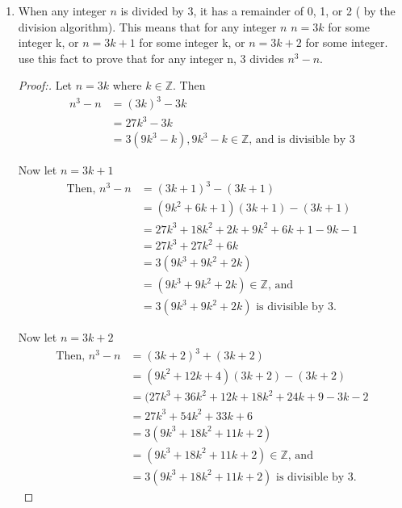 \documentclass[11pt]{article}
\begin{document}
\begin{enumerate}
    \item When any integer $n$ is divided by 3, it has a remainder of 0, 1, or 2 ( by the division algorithm). This means that for any integer $n$ 
            \newline \newline
             $n = 3k$ for some integer k, or
            \newline
            $n = 3k+1$ for some integer k, or 
            \newline
            $n = 3k+2$ for some integer.
    use this fact to prove that for any integer n, 3 divides $n^3 - n$.
        \begin{proof}[Proof:\nopunct]
         Let $n=3k$ where $k\in \mathbb{Z}$. Then
           \begin{align*}
               n^3-n & = (3k)^3-3k \\ 
                     & =27k^3-3k \\
                     & = 3(9k^3 - k), 9k^3-k \in \mathbb{Z} \text{, and is divisible by 3}
           \end{align*}
           
           \pagebreak
           Now let $n=3k+1$
           \begin{align*}
               \text{Then, } n^3-n & = (3k+1)^3-(3k+1) \\ 
                     & = (9k^2+6k+1)(3k+1)-(3k+1) \\
                     & = 27k^3 + 18k^2+2k+9k^2+6k+1-9k-1 \\
                     & = 27k^3 + 27k^2+6k \\
                     & = 3(9k^3+9k^2+2k) \\
                     & = (9k^3+9k^2+2k) \in \mathbb{Z} \text{, and} \\
                     & = 3(9k^3+9k^2+2k) \text{ is divisible by 3.}
           \end{align*}
           
           Now let $n=3k+2$
           \begin{align*}
               \text{Then, } n^3-n & = (3k+2)^3+(3k+2) \\
                                & = (9k^2+12k+4)(3k+2) - (3k+2) \\
                                & = (27k^3+36k^2+12k+18k^2+24k+9-3k-2 \\
                                & = 27k^3+54k^2+33k+6 \\
                                & = 3(9k^3+18k^2+11k+2) \\
                                & = (9k^3+18k^2+11k+2) \in \mathbb{Z} \text{, and} \\
                                & = 3(9k^3+18k^2+11k+2) \text{ is divisible by 3.}
           \end{align*}
           

\end{proof}
\end{enumerate}
\end{document}
